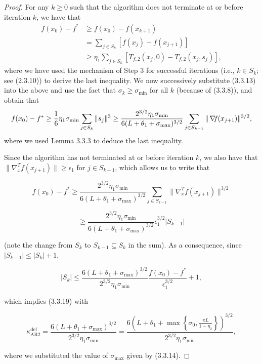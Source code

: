\documentclass[10pt,a4paper]{article}
\begin{document}
\begin{proof}For any $k \geq 0$ such that the algorithm does not terminate at or before iteration $k$, we have that
\begin{align*}
	f(x_0) - f^* &\geq f(x_0) - f(x_{k+1}) \\
	&= \sum_{j \in S_k} [f(x_j) - f(x_{j+1})] \\
	&\geq \eta_1 \sum_{j \in S_k} [T_{f,2}(x_j, 0) - T_{f,2}(x_j, s_j)],
\end{align*}
where we have used the mechanism of Step 3 for successful iterations (i.e., $k \in S_k$; see (2.3.10)) to derive the last inequality. We now successively substitute (3.3.13) into the above and use the fact that $\sigma_k \geq \sigma_{\min}$ for all $k$ (because of (3.3.8)), and obtain that
\begin{equation*}
	f(x_0) - f^* \geq \frac{1}{6}\eta_1 \sigma_{\min} \sum_{j \in S_k} \|s_j\|^3 \geq \frac{2^{3/2} \eta_1 \sigma_{\min}}{6(L + \theta_1 + \sigma_{\max})^{3/2}} \sum_{j \in S_{k-1}} \|\operatorname*{\mathit{\nabla \!f}}(x_{j+1})\|^{3/2},
\end{equation*}
where we used Lemma 3.3.3 to deduce the last inequality.

Since the algorithm has not terminated at or before iteration $k$, we also have that
$\|\nabla_x^T f(x_{j+1})\| \geq \epsilon_1$ for $j \in S_{k-1}$, which allows us to write that

\begin{equation*}
f(x_0) - f^* \geq \frac{2^{3/2} \eta_1 \sigma_{\min}}{6(L + \theta_1 + \sigma_{\max})^{3/2}} \sum_{j \in S_{k-1}} \|\nabla_x^T f(x_{j+1})\|^{3/2}
\end{equation*}

\begin{equation*}
\geq \frac{2^{3/2} \eta_1 \sigma_{\min}}{6(L + \theta_1 + \sigma_{\max})^{3/2}} \epsilon_1^{3/2} |S_{k-1}|
\end{equation*}

(note the change from $S_k$ to $S_{k-1} \subseteq S_k$ in the sum). As a consequence, since $|S_{k-1}| \leq |S_k| + 1$,

\begin{equation*}
|S_k| \leq \frac{6(L + \theta_1 + \sigma_{\max})^{3/2}}{2^{3/2} \eta_1 \sigma_{\min}} \frac{f(x_0) - f^*}{\epsilon_1^{3/2}} + 1,
\end{equation*}

which implies (3.3.19) with

\begin{equation*}
\kappa_{\text{AR2}}^{\text{def}} = \frac{6(L + \theta_1 + \sigma_{\max})^{3/2}}{2^{3/2} \eta_1 \sigma_{\min}} = \frac{6\left(L + \theta_1 + \max\left\{\sigma_0, \frac{\pi L}{1-\eta_2}\right\}\right)^{3/2}}{2^{3/2} \eta_1 \sigma_{\min}},
\end{equation*}

where we substituted the value of $\sigma_{\max}$ given by (3.3.14).
\end{proof}
\end{document}
